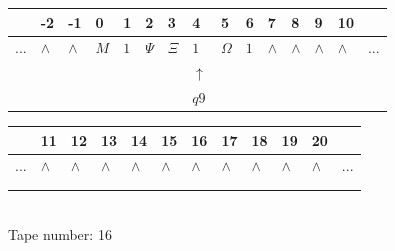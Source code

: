 \documentclass[11pt]{article}
\begin{document}
\begin{table}[H]
\centering
\begin{tabular}{lllllllllllllll}
 & -2 & -1 & 0 & 1 & 2 & 3 & 4 & 5 & 6 & 7 & 8 & 9 & 10 & \\
\hline
$...$ & \multicolumn{1}{|l|}{$\wedge$} & \multicolumn{1}{|l|}{$\wedge$} & \multicolumn{1}{|l|}{$M$} & \multicolumn{1}{|l|}{$1$} & \multicolumn{1}{|l|}{$\Psi$} & \multicolumn{1}{|l|}{$\Xi$} & \multicolumn{1}{|l|}{$1$} & \multicolumn{1}{|l|}{$\Omega$} & \multicolumn{1}{|l|}{$1$} & \multicolumn{1}{|l|}{$\wedge$} & \multicolumn{1}{|l|}{$\wedge$} & \multicolumn{1}{|l|}{$\wedge$} & \multicolumn{1}{|l|}{$\wedge$} & $...$\\
\hline
&  &  &  &  &  &  & $\uparrow$ &  &  &  &  &  &  &  \\
&  &  &  &  &  &  & $ q9 $ &  &  &  &  &  &  &  \\
\end{tabular}
\begin{tabular}{llllllllllll}
 & 11 & 12 & 13 & 14 & 15 & 16 & 17 & 18 & 19 & 20 & \\
\hline
$...$ & \multicolumn{1}{|l|}{$\wedge$} & \multicolumn{1}{|l|}{$\wedge$} & \multicolumn{1}{|l|}{$\wedge$} & \multicolumn{1}{|l|}{$\wedge$} & \multicolumn{1}{|l|}{$\wedge$} & \multicolumn{1}{|l|}{$\wedge$} & \multicolumn{1}{|l|}{$\wedge$} & \multicolumn{1}{|l|}{$\wedge$} & \multicolumn{1}{|l|}{$\wedge$} & \multicolumn{1}{|l|}{$\wedge$} & $...$\\
\hline
&  &  &  &  &  &  &  &  &  &  &  \\
&  &  &  &  &  &  &  &  &  &  &  \\
\end{tabular}
\\
Tape number: 16
\noindent\makebox[\linewidth]{\hdashrule{\textwidth}{1pt}{1pt}}\end{table}
\end{document}
